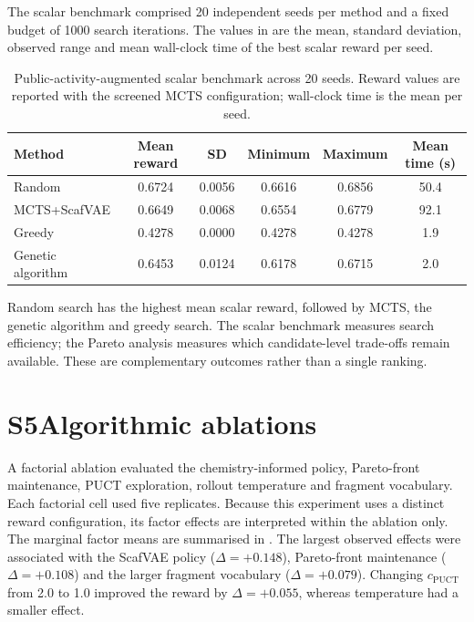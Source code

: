 \documentclass[10pt,a4paper]{article}
\begin{document}
The scalar benchmark comprised \num{20} independent seeds per method and a
fixed budget of \num{1000} search iterations. The values in
 are the mean, standard deviation, observed range and
mean wall-clock time of the best scalar reward per seed.

\begin{table}[htbp]
  \centering
  \caption{Public-activity-augmented scalar benchmark across \num{20} seeds.
  Reward values are reported with the screened MCTS configuration; wall-clock
  time is the mean per seed.}
  \label{tab:sm_benchmark}
  \begin{tabular}{lccccc}
    \toprule
    Method & Mean reward & SD & Minimum & Maximum & Mean time (s) \\
    \midrule
    Random        & \num{0.6724} & \num{0.0056} & \num{0.6616} & \num{0.6856} & \num{50.4} \\
    MCTS+ScafVAE  & \num{0.6649} & \num{0.0068} & \num{0.6554} & \num{0.6779} & \num{92.1} \\
    Greedy        & \num{0.4278} & \num{0.0000} & \num{0.4278} & \num{0.4278} & \num{1.9} \\
    Genetic algorithm & \num{0.6453} & \num{0.0124} & \num{0.6178} & \num{0.6715} & \num{2.0} \\
    \bottomrule
  \end{tabular}
\end{table}

Random search has the highest mean scalar reward, followed by MCTS, the genetic algorithm and greedy search. The scalar benchmark measures search efficiency; the Pareto analysis measures which candidate-level trade-offs remain available. These are complementary outcomes rather than a single ranking.

\section*{S5\hspace{0.6em}Algorithmic ablations}

A factorial ablation evaluated the chemistry-informed policy, Pareto-front maintenance, PUCT exploration, rollout temperature and fragment vocabulary. Each factorial cell used five replicates. Because this experiment uses a distinct reward configuration, its factor effects are interpreted within the ablation only. The marginal factor means are summarised in
. The largest observed effects were associated
with the ScafVAE policy ($\Delta=+\num{0.148}$), Pareto-front maintenance
($\Delta=+\num{0.108}$) and the larger fragment vocabulary
($\Delta=+\num{0.079}$). Changing $c_{\mathrm{PUCT}}$ from \num{2.0} to
\num{1.0} improved the reward by $\Delta=+\num{0.055}$, whereas temperature
had a smaller effect.
\end{document}
